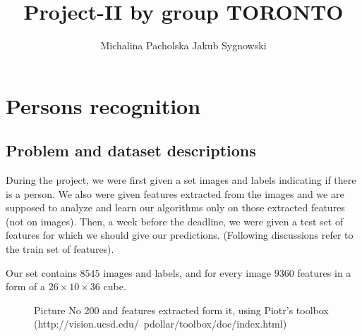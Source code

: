 \documentclass{article}
\title{Project-II by group TORONTO}
\author{Michalina Pacholska \And Jakub Sygnowski}
\begin{document}
\section{Persons recognition}
\subsection{Problem and dataset descriptions}
 During the project, we were first given a set images and labels indicating if there is a person. We also were given features extracted from the images and we are supposed to analyze and learn our algorithms only on those extracted features (not on images). Then, a week before the deadline, we were given a test set of features for which we should give our predictions. (Following discussions refer to the train set of features). 
 
 Our set contains $8545$ images and labels, and for every image $9360$ features in a form of a $26\times10\times36$ cube.

 \begin{figure}[!h]
  \center
   \;
  \caption{Picture No 200 and features extracted form it, using Piotr's toolbox (http://vision.ucsd.edu/~pdollar/toolbox/doc/index.html) %
  }
\end{figure}
\end{document}
